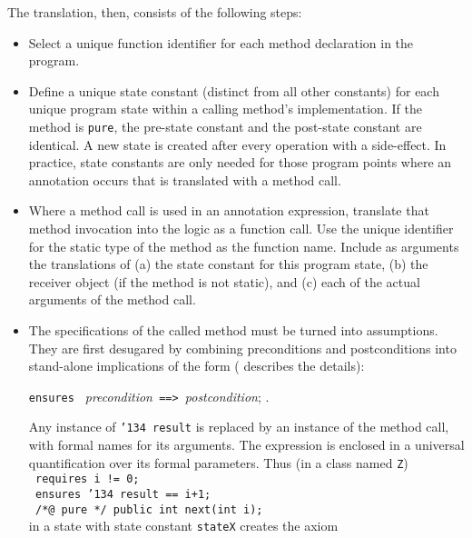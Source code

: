 \documentclass{sig-alternate}
\begin{document}
The translation, then, consists of the following steps:
\setlength{\partopsep}{0in}\setlength{\parskip}{0in}\setlength{\itemsep}{0in}\setlength{\topsep}{0in}
\begin{itemize}
\setlength{\partopsep}{0in}\setlength{\parskip}{0in}\setlength{\itemsep}{0in}\setlength{\topsep}{0in}
\item Select a unique function identifier for each method declaration 
in the program.
\item Define a unique state constant (distinct from all other constants) for each unique program
state within a calling method's implementation.  
If the method is \texttt{pure}, the pre-state constant and the post-state
constant are identical.  A new state is created after every operation with a side-effect.  
In
practice, state constants are only needed for those program points where an annotation occurs
that is translated with
a method call.
\item Where a method call is used in an annotation expression, translate that method invocation
into the logic as a function call.  Use the unique identifier for the static
type of the method as the function name.  Include as arguments the translations of (a) the
state constant for this  program state, (b) the receiver object (if the method is not static),
and (c) each of the actual arguments of the method call.
\item The specifications of the called method must be turned into assumptions.  They 
are first desugared by combining preconditions and postconditions
into stand-alone implications of the form (\cite{Raghavan-Leavens03} describes the details):
\begin{center} \texttt{ensures } {\em precondition}\texttt{ ==> }{\em postcondition}; .\end{center}
Any instance of \texttt{\char'134 result} is replaced by an instance of the method call, with
formal names for its arguments.  The expression is enclosed in a universal quantification over
its formal parameters.  Thus (in a class named \texttt{Z})\\
{\indent \texttt{        requires i != 0;}\\
\indent \texttt{       ensures \char'134 result == i+1; }\\
\indent \texttt{        /*@ pure */ public int next(int i);}\\
}
in a state with state constant \texttt{stateX} creates the axiom \\

\end{itemize}
\end{document}
